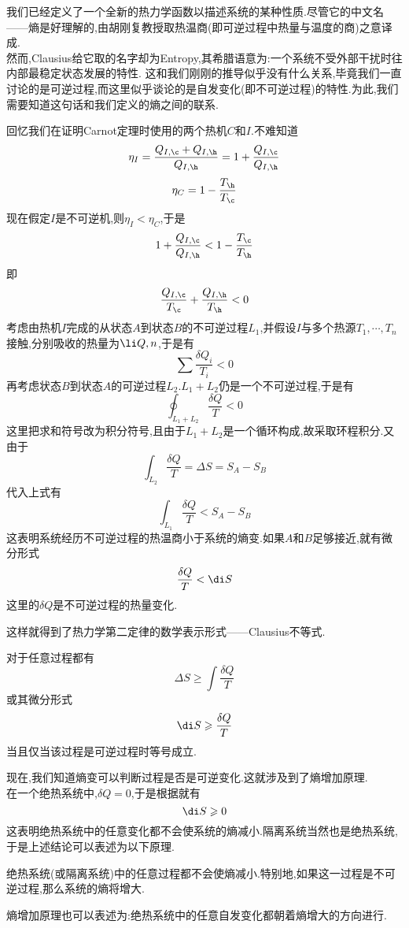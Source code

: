 \documentclass{ctexart}
\begin{document}
\indent 我们已经定义了一个全新的热力学函数以描述系统的某种性质.尽管它的中文名——熵是好理解的,由胡刚复教授取热温商(即可逆过程中热量与温度的商)之意译成.\\
\indent 然而,Clausius给它取的名字却为Entropy,其希腊语意为:一个系统不受外部干扰时往内部最稳定状态发展的特性.%
这和我们刚刚的推导似乎没有什么关系,毕竟我们一直讨论的是可逆过程,而这里似乎谈论的是自发变化(即不可逆过程)的特性.为此,我们需要知道这句话和我们定义的熵之间的联系.
\begin{derivation}
    回忆我们在证明Carnot定理时使用的两个热机$C$和$I$.不难知道
    \[\eta_I=\dfrac{Q_{I,\c}+Q_{I,\h}}{Q_{I,\h}}=1+\dfrac{Q_{I,\c}}{Q_{I,\h}}\]
    \[\eta_C=1-\dfrac{T_\h}{T_\c}\]
    现在假定$I$是不可逆机,则$\eta_I<\eta_C$,于是
    \[1+\dfrac{Q_{I,\c}}{Q_{I,\h}}<1-\dfrac{T_\c}{T_\h}\]
    即
    \[\dfrac{Q_{I,\c}}{T_\c}+\dfrac{Q_{I,\h}}{T_\h}<0\]
    考虑由热机$I$完成的从状态$A$到状态$B$的不可逆过程$L_1$,并假设$I$与多个热源$T_1,\cdots,T_n$接触,分别吸收的热量为$\li Q,n$,于是有
    \[\sum\dfrac{\delta Q_i}{T_i}<0\]
    再考虑状态$B$到状态$A$的可逆过程$L_2$.$L_1+L_2$仍是一个不可逆过程,于是有
    \[\oint_{L_1+L_2}\dfrac{\delta Q}{T}<0\]
    这里把求和符号改为积分符号,且由于$L_1+L_2$是一个循环构成,故采取环程积分.又由于
    \[\int_{L_2}\dfrac{\delta Q}{T}=\Delta S=S_A-S_B\]
    代入上式有
    \[\int_{L_1}\dfrac{\delta Q}{T}<S_A-S_B\]
    这表明系统经历不可逆过程的热温商小于系统的熵变.如果$A$和$B$足够接近,就有微分形式
    \[\dfrac{\delta Q}{T}<\di S\]
    这里的$\delta Q$是不可逆过程的热量变化.
\end{derivation}
这样就得到了热力学第二定律的数学表示形式——Clausius不等式.
\begin{theorem}[3A.3.2 Clausius不等式]
    对于任意过程都有
    \[\Delta S\geqslant\int\dfrac{\delta Q}{T}\]
    或其微分形式
    \[\di S\geqslant\dfrac{\delta Q}{T}\]
    当且仅当该过程是可逆过程时等号成立.
\end{theorem}
现在,我们知道熵变可以判断过程是否是可逆变化.这就涉及到了熵增加原理.\vspace{4pt}\\
\indent 在一个绝热系统中,$\delta Q=0$,于是根据就有
\[\di S\geqslant 0\]
\indent 这表明绝热系统中的任意变化都不会使系统的熵减小.隔离系统当然也是绝热系统,于是上述结论可以表述为以下原理.
\begin{theorem}[3A.3.3 熵增加原理]
    绝热系统(或隔离系统)中的任意过程都不会使熵减小.特别地,如果这一过程是不可逆过程,那么系统的熵将增大.
\end{theorem}
熵增加原理也可以表述为:绝热系统中的任意自发变化都朝着熵增大的方向进行.\\
\end{document}
